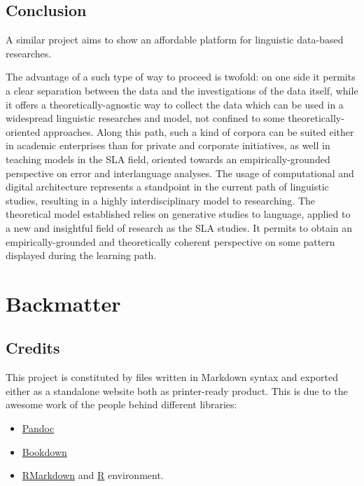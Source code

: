 \documentclass[a4paper,twoside,11pt,chapterprefix=true,listof=totocnumbered,bibliography=totocnumbered]{scrbook}
\providecommand{\tightlist}{%
  \setlength{\itemsep}{0pt}\setlength{\parskip}{0pt}}
\theoremstyle{definition}
\theoremstyle{definition}
\theoremstyle{definition}
\theoremstyle{remark}
\begin{document}
\section{Conclusion}\label{conclusion}

A similar project aims to show an affordable platform for linguistic
data-based researches.

The advantage of a such type of way to proceed is twofold: on one side
it permits a clear separation between the data and the investigations of
the data itself, while it offers a theoretically-agnostic way to collect
the data which can be used in a widespread linguistic researches and
model, not confined to some theoretically-oriented approaches. Along
this path, such a kind of corpora can be suited either in academic
enterprises than for private and corporate initiatives, as well in
teaching models in the SLA field, oriented towards an
empirically-grounded perspective on error and interlanguage analyses.
The usage of computational and digital architecture
\citep[\citet{kurdi_natural_2016-2},
\citet{kuebler-corpus_linguistics}]{clark_handbook_2010-1} represents a
standpoint in the current path of linguistic studies, resulting in a
highly interdisciplinary model to researching. The theoretical model
established relies on generative studies to language, applied to a new
and insightful field of research as the SLA studies. It permits to
obtain an empirically-grounded and theoretically coherent perspective on
some pattern displayed during the learning path.

\chapter*{Backmatter}\label{backmatter}

\listoffigures

\listoftables

\lstlistoflistings

\section*{Credits}\label{credits}

This project is constituted by files written in Markdown syntax and
exported either as a standalone website both as printer-ready product.
This is due to the awesome work of the people behind different
libraries:

\begin{itemize}
\tightlist
\item
  \href{https://bookdown.org}{Pandoc}
\item
  \href{https://bookdown.org}{Bookdown}
\item
  \href{https://bookdown.org}{RMarkdown} and
  \href{https://bookdown.org}{R} environment.
\end{itemize}
\end{document}
